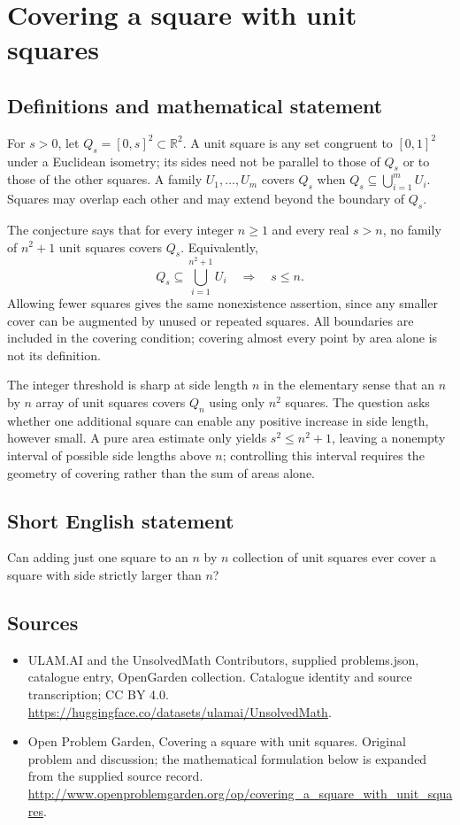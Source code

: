 \documentclass[11pt,a4paper]{article}
\begin{document}
\section*{Covering a square with unit squares}\label{statement}

\subsection{Definitions and mathematical statement}
For $s>0$, let $Q_s=[0,s]^2\subset\mathbb R^2$.
A unit square is any set congruent to $[0,1]^2$ under a Euclidean isometry;
its sides need not be parallel to those of $Q_s$ or to those of the
other squares. A family $U_1,\ldots,U_m$ covers $Q_s$ when
$Q_s\subseteq\bigcup_{i=1}^m U_i$. Squares may overlap each other and
may extend beyond the boundary of $Q_s$.

The conjecture says that for every integer $n\ge1$ and every real
$s>n$, no family of $n^2+1$ unit squares covers $Q_s$. Equivalently,
\[
 Q_s\subseteq\bigcup_{i=1}^{n^2+1}U_i
       \quad\Longrightarrow\quad s\le n.
\]
Allowing fewer squares gives the same nonexistence assertion, since any
smaller cover can be augmented by unused or repeated squares. All boundaries
are included in the covering condition; covering almost every point by
area alone is not its definition.

The integer threshold is sharp at side length $n$ in the elementary
sense that an $n$ by $n$ array of unit squares covers $Q_n$ using only
$n^2$ squares. The question asks whether one additional square can enable
any positive increase in side length, however small. A pure area estimate
only yields $s^2\le n^2+1$, leaving a nonempty interval of possible side
lengths above $n$; controlling this interval requires the geometry of
covering rather than the sum of areas alone.
\subsection{Short English statement}
Can adding just one square to an $n$ by $n$ collection of unit squares ever cover a square with side strictly larger than $n$?
\subsection{Sources}
\begin{itemize}
\item[S1] ULAM.AI and the UnsolvedMath Contributors, supplied problems.json, catalogue entry, OpenGarden collection. Catalogue identity and source transcription; CC BY 4.0.
\url{https://huggingface.co/datasets/ulamai/UnsolvedMath}.
\item[S2] Open Problem Garden, Covering a square with unit squares. Original problem and discussion; the mathematical formulation below is expanded from the supplied source record.
\url{http://www.openproblemgarden.org/op/covering_a_square_with_unit_squares}.
\end{itemize}
\end{document}
